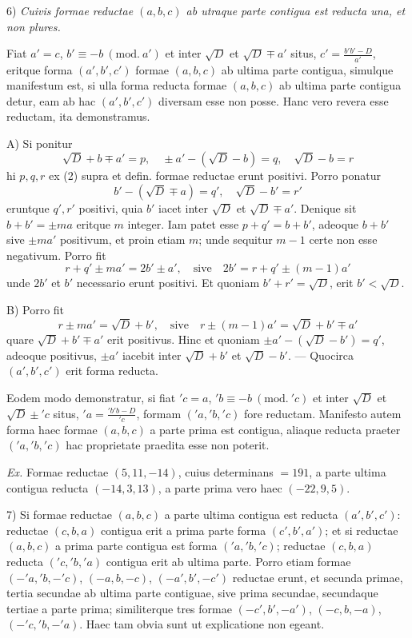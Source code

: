 6) \textit{Cuivis formae reductae $(a,b,c)$ ab utraque parte contigua est reducta una, et non plures.}

Fiat $a'=c$, $b'\equiv-b\ (\mathrm{mod.}\ a')$ et inter $\surd D$ et $\surd D\mp a'$ situs, $c'=\frac{b'b'-D}{a'}$, eritque forma $(a',b',c')$ formae $(a,b,c)$ ab ultima parte contigua, simulque manifestum est, si ulla forma reducta formae $(a,b,c)$ ab ultima parte contigua detur, eam ab hac $(a',b',c')$ diversam esse non posse. Hanc vero revera esse reductam, ita demonstramus.

A) Si ponitur
\[
\surd D+b\mp a'=p,\quad\pm a'-(\surd D-b)=q,\quad\surd D-b=r
\]
hi $p,q,r$ ex (2) supra et defin. formae reductae erunt positivi. Porro ponatur
\[
b'-(\surd D\mp a)=q',\quad\surd D-b'=r'
\]
eruntque $q',r'$ positivi, quia $b'$ iacet inter $\surd D$ et $\surd D\mp a'$. Denique sit $b+b'=\pm ma$ eritque $m$ integer. Iam patet esse $p+q'=b+b'$, adeoque $b+b'$ sive $\pm ma'$ positivum, et proin etiam $m$; unde sequitur $m-1$ certe non esse negativum. Porro fit
\[
r+q'\pm ma'=2b'\pm a',\quad\text{sive}\quad2b'=r+q'\pm(m-1)a'
\]
unde $2b'$ et $b'$ necessario erunt positivi. Et quoniam $b'+r'=\surd D$, erit $b'<\surd D$.

B) Porro fit
\[
r\pm ma'=\surd D+b',\quad\text{sive}\quad r\pm(m-1)a'=\surd D+b'\mp a'
\]
quare $\surd D+b'\mp a'$ erit positivus. Hinc et quoniam $\pm a'-(\surd D-b')=q'$,
adeoque positivus, $\pm a'$ iacebit inter $\surd D+b'$ et $\surd D-b'$. --- Quocirca $(a',b',c')$ erit forma reducta.

Eodem modo demonstratur, si fiat ${}'c=a$, ${}'b\equiv-b\ (\mathrm{mod.}\ {}'c)$ et inter $\surd D$ et $\surd D\pm{}'c$ situs, ${}'a=\frac{{}'b{}'b-D}{{}'c}$, formam $({}'a,{}'b,{}'c)$ fore reductam. Manifesto autem forma haec formae $(a,b,c)$ a parte prima est contigua, aliaque reducta praeter $({}'a,{}'b,{}'c)$ hac proprietate praedita esse non poterit.

\textit{Ex.} Formae reductae $(5,11,-14)$, cuius determinans $=191$, a parte ultima contigua reducta $(-14,3,13)$, a parte prima vero haec $(-22,9,5)$.

7) Si formae reductae $(a,b,c)$ a parte ultima contigua est reducta $(a',b',c')$: reductae $(c,b,a)$ contigua erit a prima parte forma $(c',b',a')$; et si reductae $(a,b,c)$ a prima parte contigua est forma $({}'a,{}'b,{}'c)$; reductae $(c,b,a)$ reducta $({}'c,{}'b,{}'a)$ contigua erit ab ultima parte. Porro etiam formae $(-{}'a,{}'b,-{}'c)$, $(-a,b,-c)$, $(-a',b',-c')$ reductae erunt, et secunda primae, tertia secundae ab ultima parte contiguae, sive prima secundae, secundaque tertiae a parte prima; similiterque tres formae $(-c',b',-a')$, $(-c,b,-a)$, $(-{}'c,{}'b,-{}'a)$. Haec tam obvia sunt ut explicatione non egeant.


